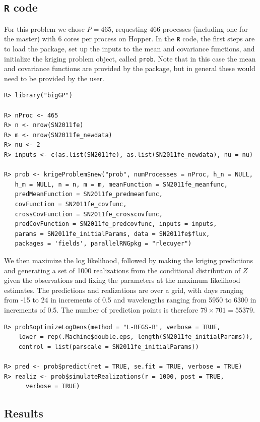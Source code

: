 \documentclass[12pt]{article}
\newcommand{\proglang}[1]{\textbf{\texttt{#1}}}
\newcommand{\code}[1]{\texttt{#1}}
\begin{document}
\subsection[R code]{\proglang{R} code}
For this problem we chose $P=465$, requesting $466$ processes (including one for the master) with $6$ cores per process on Hopper. In the \proglang{R} code, the first steps are to load the package, set up the inputs to the mean and covariance functions, and initialize the kriging problem object, called \code{prob}. Note that in this case the mean and covariance functions are provided by the package, but in general these would need to be provided by the user. 
\begin{verbatim}
R> library("bigGP")

R> nProc <- 465
R> n <- nrow(SN2011fe)
R> m <- nrow(SN2011fe_newdata)
R> nu <- 2
R> inputs <- c(as.list(SN2011fe), as.list(SN2011fe_newdata), nu = nu)

R> prob <- krigeProblem$new("prob", numProcesses = nProc, h_n = NULL, 
   h_m = NULL, n = n, m = m, meanFunction = SN2011fe_meanfunc, 
   predMeanFunction = SN2011fe_predmeanfunc, 
   covFunction = SN2011fe_covfunc, 
   crossCovFunction = SN2011fe_crosscovfunc, 
   predCovFunction = SN2011fe_predcovfunc, inputs = inputs, 
   params = SN2011fe_initialParams, data = SN2011fe$flux, 
   packages = 'fields', parallelRNGpkg = "rlecuyer")
\end{verbatim}
We then maximize the log likelihood, followed by making the kriging predictions and generating a set of 1000 realizations from the conditional distribution of $Z$ given the observations and fixing the parameters at the maximum likelihood estimates. The predictions and realizations are over a grid, with days ranging from -15 to 24 in increments of 0.5 and wavelengths ranging from 5950 to 6300 in increments of 0.5. The number of prediction points is therefore $79 \times 701 = 55379$.
\begin{verbatim}
R> prob$optimizeLogDens(method = "L-BFGS-B", verbose = TRUE, 
    lower = rep(.Machine$double.eps, length(SN2011fe_initialParams)), 
    control = list(parscale = SN2011fe_initialParams))

R> pred <- prob$predict(ret = TRUE, se.fit = TRUE, verbose = TRUE)
R> realiz <- prob$simulateRealizations(r = 1000, post = TRUE, 
      verbose = TRUE)

\end{verbatim}

\subsection{Results}
\end{document}
